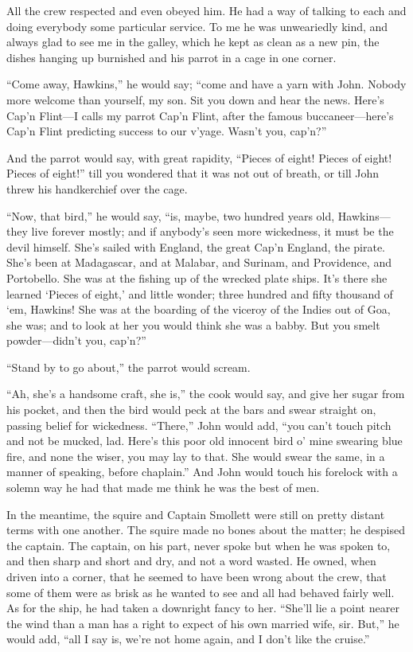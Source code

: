 All the crew respected and even obeyed him. He had a way of talking to each and doing everybody some particular service. To me he was unweariedly kind, and always glad to see me in the galley, which he kept as clean as a new pin, the dishes hanging up burnished and his parrot in a cage in one corner.

\enquote{Come away, Hawkins,} he would say; \enquote{come and have a yarn with John. Nobody more welcome than yourself, my son. Sit you down and hear the news. Here’s Cap’n Flint---I calls my parrot Cap’n Flint, after the famous buccaneer---here’s Cap’n Flint predicting success to our v’yage. Wasn’t you, cap’n?}

And the parrot would say, with great rapidity, \enquote{Pieces of eight! Pieces of eight! Pieces of eight!} till you wondered that it was not out of breath, or till John threw his handkerchief over the cage.

\enquote{Now, that bird,} he would say, \enquote{is, maybe, two hundred years old, Hawkins---they live forever mostly; and if anybody’s seen more wickedness, it must be the devil himself. She’s sailed with England, the great Cap’n England, the pirate. She’s been at Madagascar, and at Malabar, and Surinam, and Providence, and Portobello. She was at the fishing up of the wrecked plate ships. It’s there she learned ‘Pieces of eight,’ and little wonder; three hundred and fifty thousand of `em, Hawkins! She was at the boarding of the viceroy of the Indies out of Goa, she was; and to look at her you would think she was a babby. But you smelt powder---didn’t you, cap’n?}

\enquote{Stand by to go about,} the parrot would scream.

\enquote{Ah, she’s a handsome craft, she is,} the cook would say, and give her sugar from his pocket, and then the bird would peck at the bars and swear straight on, passing belief for wickedness. \enquote{There,} John would add, \enquote{you can’t touch pitch and not be mucked, lad. Here’s this poor old innocent bird o’ mine swearing blue fire, and none the wiser, you may lay to that. She would swear the same, in a manner of speaking, before chaplain.} And John would touch his forelock with a solemn way he had that made me think he was the best of men.

In the meantime, the squire and Captain Smollett were still on pretty distant terms with one another. The squire made no bones about the matter; he despised the captain. The captain, on his part, never spoke but when he was spoken to, and then sharp and short and dry, and not a word wasted. He owned, when driven into a corner, that he seemed to have been wrong about the crew, that some of them were as brisk as he wanted to see and all had behaved fairly well. As for the ship, he had taken a downright fancy to her. \enquote{She’ll lie a point nearer the wind than a man has a right to expect of his own married wife, sir. But,} he would add, \enquote{all I say is, we’re not home again, and I don’t like the cruise.}

